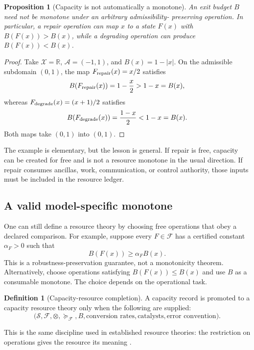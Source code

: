 \documentclass[11pt]{article}
\newtheorem{proposition}[theorem]{Proposition}
\theoremstyle{definition}
\newtheorem{definition}[theorem]{Definition}
\theoremstyle{remark}
\newcommand{\cA}{\mathcal A}
\newcommand{\cF}{\mathcal F}
\newcommand{\cS}{\mathcal S}
\newcommand{\cX}{\mathcal X}
\begin{document}
\begin{proposition}[Capacity is not automatically a monotone]
\label{prop:notmonotone}
An exit budget \(B\) need not be monotone under an arbitrary admissibility-
preserving operation.  In particular, a repair operation can map \(x\) to a
state \(F(x)\) with \(B(F(x))>B(x)\), while a degrading operation can produce
\(B(F(x))<B(x)\).
\end{proposition}

\begin{proof}
Take \(\cX=\mathbb R\), \(\cA=(-1,1)\), and
\(B(x)=1-|x|\).  On the admissible subdomain \((0,1)\), the map
\(F_{\rm repair}(x)=x/2\) satisfies
\[
 B(F_{\rm repair}(x))=1-\frac{x}{2}>1-x=B(x),
\]
whereas \(F_{\rm degrade}(x)=(x+1)/2\) satisfies
\[
 B(F_{\rm degrade}(x))
 =
 \frac{1-x}{2}
 <
 1-x
 =
 B(x).
\]
Both maps take \((0,1)\) into \((0,1)\).
\end{proof}

The example is elementary, but the lesson is general.  If repair is free,
capacity can be created for free and is not a resource monotone in the usual
direction.  If repair consumes ancillas, work, communication, or control
authority, those inputs must be included in the resource ledger.

\subsection{A valid model-specific monotone}

One can still define a resource theory by choosing free operations that
obey a declared comparison.  For example, suppose every \(F\in\cF\) has a
certified constant \(\alpha_F>0\) such that
\[
 B(F(x))\ge\alpha_F B(x).
\]
This is a robustness-preservation guarantee, not a monotonicity theorem.
Alternatively, choose operations satisfying \(B(F(x))\le B(x)\) and use
\(B\) as a consumable monotone.  The choice depends on the operational task.

\begin{definition}[Capacity-resource completion]
A capacity record is promoted to a capacity resource theory only when the
following are supplied:
\[
 \bigl(
 \cS,\cF,\otimes,\succeq_{\cF},
 B,\text{conversion rates},\text{catalysts},
 \text{error convention}
 \bigr).
\]
\end{definition}

This is the same discipline used in established resource theories: the
restriction on operations gives the resource its meaning
\cite{CoeckeFritzSpekkens2016,ChitambarGour2019}.
\end{document}
